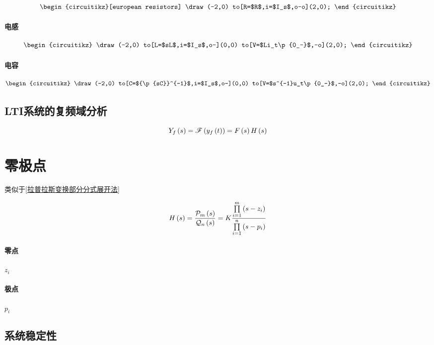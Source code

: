 \documentclass{article}
\begin{document}
\[\begin{circuitikz}[european resistors]
        \draw(-2,0)
        to[R=$R$,i=$I_s$,o-o](2,0);
    \end{circuitikz}\]

\paragraph{电感}

\[\begin{circuitikz}
        \draw(-2,0)
        to[L=$sL$,i=$I_s$,o-](0,0)
        to[V=$Li_t\p{0_-}$,-o](2,0);
    \end{circuitikz}\]

\paragraph{电容}

\[\begin{circuitikz}
        \draw(-2,0)
        to[C=${\p{sC}}^{-1}$,i=$I_s$,o-](0,0)
        to[V=$s^{-1}u_t\p{0_-}$,-o](2,0);
    \end{circuitikz}\]

\subsection{LTI系统的复频域分析}

\[Y_f\left(s\right)=\mathscr F\left(y_f\left(t\right)\right)=F\left(s\right) H\left(s\right)\]

\section{零极点}

类似于\ref{拉普拉斯变换部分分式展开法}

\[H\left(s\right)=\frac{\mathcal P_m\left(s\right)}{\mathcal Q_n\left(s\right)}
    =K\frac{\prod\limits_{i=1}^m\left(s-z_i\right)}
    {\prod\limits_{i=1}^n\left(s-p_i\right)}\]

\paragraph{零点}$z_i$

\paragraph{极点}$p_i$

\subsection{系统稳定性}
\end{document}
